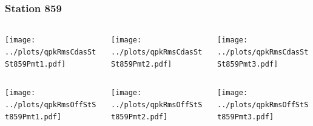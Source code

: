 \documentclass[aspectratio=169]{beamer}
\begin{document}
\begin{frame} 
  \frametitle{Station 859}
  \begin{center}
    \begin{columns}
      \begin{column}{0.33\textwidth}
        \texttt{[image: ../plots/qpkRmsCdasStSt859Pmt1.pdf]}
      \end{column}
      \begin{column}{0.33\textwidth}
        \texttt{[image: ../plots/qpkRmsCdasStSt859Pmt2.pdf]}
      \end{column}
      \begin{column}{0.33\textwidth}
        \texttt{[image: ../plots/qpkRmsCdasStSt859Pmt3.pdf]}
      \end{column}
    \end{columns}
  \end{center}

  \begin{center}
    \begin{columns}
      \begin{column}{0.33\textwidth}
        \texttt{[image: ../plots/qpkRmsOffStSt859Pmt1.pdf]}
      \end{column}
      \begin{column}{0.33\textwidth}
        \texttt{[image: ../plots/qpkRmsOffStSt859Pmt2.pdf]}
      \end{column}
      \begin{column}{0.33\textwidth}
        \texttt{[image: ../plots/qpkRmsOffStSt859Pmt3.pdf]}
      \end{column}
    \end{columns}
  \end{center}
\end{frame}
\end{document}
